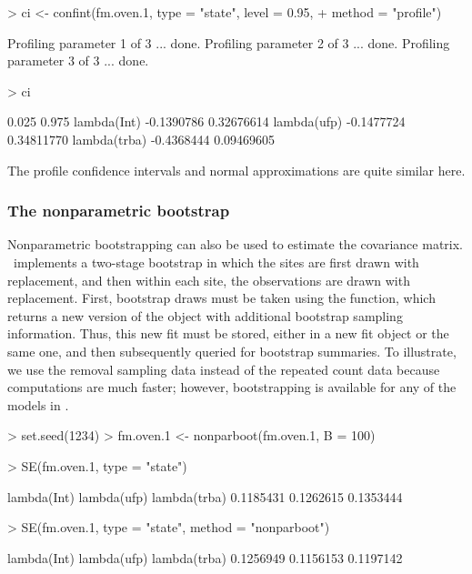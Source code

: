 \documentclass[article,shortnames]{jss}
\newcommand{\um}{\pkg{unmarked}}
\begin{document}
{\begin{Schunk}
\begin{Sinput}
> ci <- confint(fm.oven.1, type = "state", level = 0.95, 
+     method = "profile")
\end{Sinput}
\begin{Soutput}
Profiling parameter 1 of 3 ... done.
Profiling parameter 2 of 3 ... done.
Profiling parameter 3 of 3 ... done.
\end{Soutput}
\end{Schunk}
\begin{Schunk}
\begin{Sinput}
> ci
\end{Sinput}
\begin{Soutput}
                  0.025      0.975
lambda(Int)  -0.1390786 0.32676614
lambda(ufp)  -0.1477724 0.34811770
lambda(trba) -0.4368444 0.09469605
\end{Soutput}
\end{Schunk}

The profile confidence intervals and normal approximations are quite
similar here.

\subsubsection{The nonparametric bootstrap}

Nonparametric bootstrapping can also be used to estimate the
covariance matrix. \um\ implements a two-stage bootstrap in which the
 sites are first drawn with replacement, and then within each site, the
observations are drawn with replacement.  First, bootstrap draws must
be taken using the  function, which returns a new
version of the  object with additional bootstrap sampling
information.  Thus, this new fit must be stored, either in a new fit
object or the same one, and then subsequently queried for bootstrap
summaries.  To illustrate, we use the removal sampling data instead of the
repeated count data because computations are much faster; however, 
bootstrapping is available for any of the models in \um.

\begin{Schunk}
\begin{Sinput}
> set.seed(1234)
> fm.oven.1 <- nonparboot(fm.oven.1, B = 100)
\end{Sinput}
\end{Schunk}

\begin{Schunk}
\begin{Sinput}
> SE(fm.oven.1, type = "state")
\end{Sinput}
\begin{Soutput}
 lambda(Int)  lambda(ufp) lambda(trba) 
   0.1185431    0.1262615    0.1353444 
\end{Soutput}
\begin{Sinput}
> SE(fm.oven.1, type = "state", method = "nonparboot")
\end{Sinput}
\begin{Soutput}
 lambda(Int)  lambda(ufp) lambda(trba) 
   0.1256949    0.1156153    0.1197142 
\end{Soutput}
\end{Schunk}

}
\end{document}
